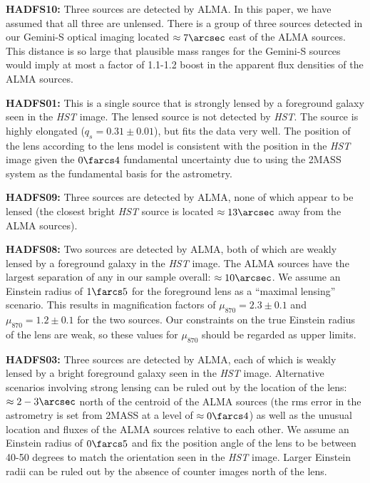 \documentclass[iop]{emulateapj}
\begin{document}
{\bf HADFS10:} Three sources are detected by ALMA.  In this paper, we have
assumed that all three are unlensed.  There is a group of three sources
detected in our Gemini-S optical imaging located $\approx 7\arcsec$ east of the
ALMA sources.  This distance is so large that plausible mass ranges for the
Gemini-S sources would imply at most a factor of 1.1-1.2 boost in the apparent
flux densities of the ALMA sources.

{\bf HADFS01:} This is a single source that is strongly lensed by a foreground
galaxy seen in the {\it HST} image.  The lensed source is not detected by {\it
HST}.  The source is highly elongated ($q_s = 0.31 \pm 0.01$), but fits the
data very well.  The position of the lens according to the lens model is
consistent with the position in the {\it HST} image given the $0\farcs4$
fundamental uncertainty due to using the 2MASS system as the fundamental basis
for the astrometry.

{\bf HADFS09:} Three sources are detected by ALMA, none of which appear to be
lensed (the closest bright {\it HST} source is located $\approx 13\arcsec$ away
from the ALMA sources).

{\bf HADFS08:} Two sources are detected by ALMA, both of which are weakly lensed
by a foreground galaxy in the {\it HST} image.  The ALMA sources have the
largest separation of any in our sample overall: $\approx 10\arcsec$.  We
assume an Einstein radius of $1\farcs5$ for the foreground lens as a ``maximal
lensing'' scenario.  This results in magnification factors of $\mu_{870} = 2.3
\pm 0.1$ and $\mu_{870} = 1.2 \pm 0.1$ for the two sources.  Our constraints on
the true Einstein radius of the lens are weak, so these values for $\mu_{870}$
should be regarded as upper limits.

{\bf HADFS03:} Three sources are detected by ALMA, each of which is weakly
lensed by a bright foreground galaxy seen in the {\it HST} image.  Alternative
scenarios involving strong lensing can be ruled out by the location of the
lens: $\approx 2-3\arcsec$ north of the centroid of the ALMA sources (the rms
error in the astrometry is set from 2MASS at a level of $\approx 0\farcs4$) as
well as the unusual location and fluxes of the ALMA sources relative to each
other.  We assume an Einstein radius of $0\farcs5$ and fix the position angle
of the lens to be between 40-50 degrees to match the orientation seen in the
{\it HST} image.  Larger Einstein radii can be ruled out by the absence of
counter images north of the lens.
\end{document}

